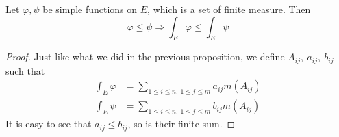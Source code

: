 \documentclass[lang=en, 12pt]{elegantbook}
\begin{document}
            \begin{proposition}
                Let $\varphi, \psi$ be simple functions on $E$, which is a set of finite measure. Then 
            $$\varphi \leq \psi \Rightarrow \int_E \varphi \leq \int_E \psi$$
            \end{proposition}
            \begin{proof}
                Just like what we did in the previous proposition, we define $A_{ij}, \ a_{ij}, \ b_{ij}$ such that 
            \begin{equation*}
                \begin{aligned}
                    \int_E \varphi &= \sum_{1\leq i \leq n, \ 1 \leq j \leq m} a_{ij} m(A_{ij}) \\
                    \int_E \psi &= \sum_{1\leq i \leq n, \ 1 \leq j \leq m} b_{ij} m(A_{ij}) 
                \end{aligned}
            \end{equation*}
                It is easy to see that $a_{ij} \leq b_{ij}$, so is their finite sum.
            \end{proof}
\end{document}
